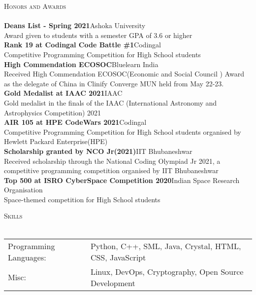\documentclass[a4paper]{article}
\newcommand{\lineunder} {
    \vspace*{-8pt} \\
    \hspace*{-18pt} \hrulefill \\
}
\newcommand{\header} [1] {
    {\hspace*{-18pt}\vspace*{6pt} \textsc{#1}}
    \vspace*{-6pt} \lineunder
}
\begin{document}
\header{Honors and Awards}
\vspace{1mm}
{\textbf{Dean\textquotesingle{}s List - Spring 2021}}\hfill Ashoka University\\
Award given to students with a semester GPA of 3.6 or higher\\
\vspace*{2.5mm}
{\textbf{Rank 19 at Codingal Code Battle \#1}}\hfill Codingal\\
Competitive Programming Competition for High School students\\
\vspace*{2.5mm}
{\textbf{High Commendation ECOSOC}}\hfill Bluelearn India\\
Received High Commendation ECOSOC(Economic and Social Council ) Award as the delegate of China in Clinify Converge MUN held from May 22-23.\\
\vspace*{2.5mm}
{\textbf{Gold Medalist at IAAC 2021}}\hfill IAAC\\
Gold medalist in the finals of the IAAC (International Astronomy and Astrophysics Competition) 2021\\
\vspace*{2.5mm}
{\textbf{AIR 105 at HPE CodeWars 2021}}\hfill Codingal\\
Competitive Programming Competition for High School students organised by Hewlett Packard Enterprise(HPE)\\
\vspace*{2.5mm}
{\textbf{Scholarship granted by NCO Jr(2021)}}\hfill IIT Bhubaneshwar\\
Received scholarship through the National Coding Olympiad Jr 2021, a competitive programming competition organised by IIT Bhubaneshwar\\
\vspace*{2.5mm}
{\textbf{Top 500 at ISRO CyberSpace Competition 2020}}\hfill Indian Space Research Organisation\\
Space-themed competition for High School students\\
\vspace*{4mm}

\header{Skills}
\vspace{1mm}

\begin{tabular}{ l l }
	Programming Languages: & Python, C++, SML, Java, Crystal, HTML, CSS, JavaScript \\
	Misc:                  & Linux, DevOps, Cryptography, Open Source Development   \\
\end{tabular}
\vspace{2mm}

\ 
\end{document}
